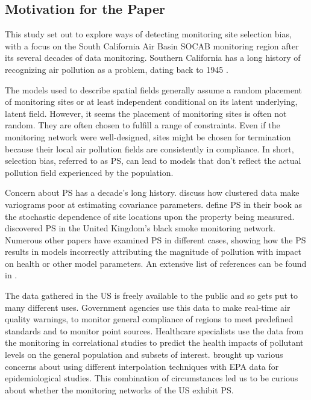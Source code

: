 \subsection{Motivation for the Paper}
\label{subsec:motivation}
This study set out to explore ways of detecting monitoring site selection bias, with a focus on the South California Air Basin SOCAB monitoring region after its several decades of data monitoring.  Southern California has a long history of recognizing air pollution as a problem, dating back to 1945 \citep{CASCAQMD:2015}.

The models used to describe spatial fields generally assume a random placement of monitoring sites or at least independent conditional on its latent underlying, latent field.  However, it seems the placement of monitoring sites is often not random. They are often chosen to fulfill a range of constraints. Even if the monitoring network were well-designed, sites might be chosen for termination because their local air pollution fields are consistently in compliance.  In short, selection bias, referred to as \ac{PS}, can lead to models that don't reflect the actual pollution field experienced by the population. 

Concern about \ac{PS} has a decade's long history. \citet{isaaks1988spatial} discuss how clustered data make variograms poor at estimating covariance parameters. \cite{diggle:07} define \ac{PS} in their book as the stochastic dependence of site locations upon the property being measured. \cite{shaddick2012preferential} discovered  \ac{PS} in the United Kingdom's black smoke monitoring network. Numerous other papers have examined \ac{PS} in different cases, showing how the \ac{PS} results in models incorrectly attributing the magnitude of pollution with impact on health or other model parameters.  An extensive list of references can be found in \citep{Zidek:2012}.  

The data gathered in the US is freely available to the public and so gets put to many different uses.  Government agencies use this data to make real-time air quality warnings, to monitor general compliance of regions to meet predefined standards and to monitor point sources.  Healthcare specialists use the data from the monitoring in correlational studies to predict the health impacts of pollutant levels on the general population and subsets of interest.  \cite{wong2004comparison} brought up various concerns about using different interpolation techniques with \ac{EPA} data for epidemiological studies.  This combination of circumstances led us to be curious about whether the monitoring networks of the US exhibit \ac{PS}.